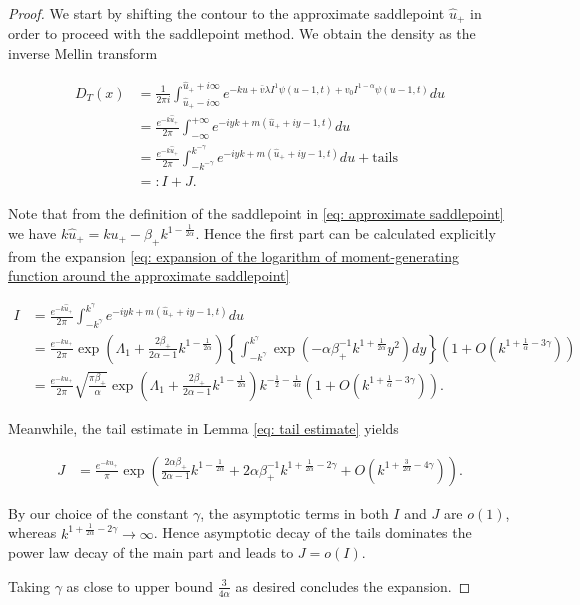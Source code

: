 \documentclass[12pt,twoside]{article}
\theoremstyle{plain}
\theoremstyle{plain}
\theoremstyle{definition}
\theoremstyle{remark}
\numberwithin{equation}{section}
\begin{document}
\vspace{10pt}

\begin{proof}

We start by shifting the contour to the approximate saddlepoint $\hat u_+$ in order to proceed with the saddlepoint method. We obtain the density as the inverse Mellin transform

$$
\begin{aligned}
D_T(x) &= \frac{1}{2\pi i} \int_{\hat u_+ -i\infty}^{\hat u_+ + i\infty} e^{-ku+\bar{v} \lambda I^{1} \psi(u-1, t)+v_{0} I^{1-\alpha} \psi(u-1, t)}du \\[10pt]
&=\frac{e^{-k\hat u_+}}{2\pi } \int_{-\infty}^{ + \infty} e^{-iyk+m(\hat u_+ + iy - 1, t)}du\\[10pt]
&=\frac{e^{-k\hat u_+}}{2\pi } \int_{-k^{-\gamma}}^{ k^{-\gamma}} e^{-iyk+m(\hat u_+ + iy - 1, t)}du + \text{tails}\\[10pt]
&=:I+J.
\end{aligned}
$$

\newpage\clearpage

Note that from the definition of the saddlepoint in \eqref{eq: approximate saddlepoint} we have $k\hat u_+ = k u_+ - \beta_+ k ^{1-\frac{1}{2\alpha}}$. Hence the first part can be calculated explicitly from the expansion \eqref{eq: expansion of the logarithm of moment-generating function around the approximate saddlepoint}

$$
\begin{aligned}
I &= \frac{e^{-k\hat u_+}}{2\pi} \int_{-k^\gamma}^{ k^\gamma} e^{-iyk+m(\hat u_+ + iy - 1, t)}du\\
&=\frac{e^{-k u_+}}{2\pi}\exp\left(\Lambda_1 + \frac{2\beta_+}{2\alpha - 1}k^{1-\frac{1}{2\alpha}}\right)\left\{\int _{-k^\gamma} ^{k^\gamma} \exp\left(-\alpha\beta_+^{-1} k ^{1+\frac{1}{2\alpha}} y^2\right) dy\right\} \left(1+O\left(k^{1+\frac 1\alpha -3\gamma}\right)\right)\\[5pt]
&=\frac{e^{-k u_+}}{2\pi} \sqrt {\frac{\pi\beta_+}{\alpha}} \exp\left(\Lambda_1 + \frac{2\beta_+}{2\alpha - 1}k^{1-\frac{1}{2\alpha}}\right) k^{-\frac 12 -\frac{1}{4\alpha}} \left(1+O\left(k^{1+\frac 1\alpha -3\gamma}\right)\right).
\end{aligned}
$$

Meanwhile, the tail estimate in Lemma \ref{eq: tail estimate} yields

$$
\begin{aligned}
J &= \frac {e^{-ku_+}}{\pi} \exp\left( \frac{2\alpha\beta_+}{2\alpha-1} k^{1-\frac{1}{2\alpha}} + 2\alpha\beta_+^{-1}k^{1+\frac{1}{2\alpha} -2\gamma} + O(k^{1+\frac{3}{2\alpha} - 4\gamma}) \right).
\end{aligned}
$$

By our choice of the constant $\gamma$, the asymptotic terms in both $I$ and $J$ are $o(1)$, whereas $k^{1+\frac{1}{2\alpha} -2\gamma}\rightarrow \infty$. Hence asymptotic decay of the tails dominates the power law decay of the main part and leads to $J=o(I)$.

Taking $\gamma$ as close to upper bound $\frac{3}{4\alpha}$ as desired concludes the expansion.

\end{proof}
\end{document}
